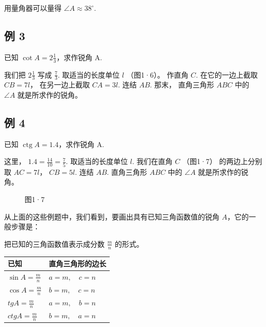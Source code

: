 用量角器可以量得 \(\angle A \approx 38^{\circ}\).

\subsection{例 3}

已知 \(\cot A = 2 \frac{1}{3}\)，求作锐角 A.

 我们把 \(2\frac{1}{3}\) 写成 \(\frac{7}{3}\).
取适当的长度单位 \(l\) （图1·6）。 作直角 \(C\). 在它的一边上截取
\(CB = 7l\)， 在另一边上截取 \(CA = 3l\). 连结 \(AB\). 那末， 直角三角形
\(ABC\) 中的 \(\angle A\) 就是所求作的锐角。

\subsection{例 4}

已知 \(\operatorname{ctg} A = 1.4\)，求作锐角 A.

 这里， \(1.4 = \frac{14}{10} = \frac{7}{5}\).
取适当的长度单位 \(l\). 我们在直角 \(C\) （图1·7） 的两边上分别取
\(AC = 7l\)， \(CB = 5l\). 连结 \(AB\). 直角三角形 \(ABC\) 中的
\(\angle A\) 就是所求作的锐角。

\begin{figure}
\centering
{}
\caption{图1·7}
\end{figure}


从上面的这些例题中，我们看到，要画出具有已知三角函数值的锐角
\(A\)，它的一般步骤是：

把已知的三角函数值表示成分数 \(\frac{m}{n}\) 的形式。

{\def\LTcaptype{none} %
\begin{longtable}[]{@{}ll@{}}
\toprule\noalign{}
已知 & 直角三角形的边长 \\
\midrule\noalign{}
\endhead
\bottomrule\noalign{}
\endlastfoot
\(\sin A = \frac{m}{n}\) & \(a = m, \quad c = n\) \\
\(\cos A = \frac{m}{n}\) & \(b = m, \quad c = n\) \\
\(tg A = \frac{m}{n}\) & \(a = m, \quad b = n\) \\
\(ctg A = \frac{m}{n}\) & \(b = m, \quad a = n\) \\
\end{longtable}
}

